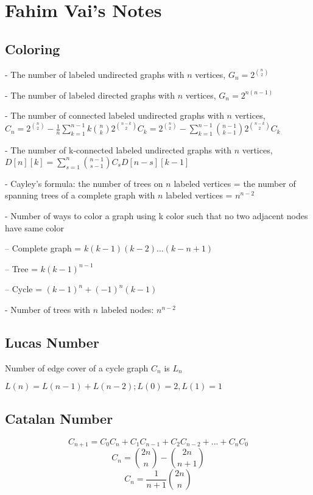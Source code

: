 \chapter{Fahim Vai's Notes}
\section{Coloring}

- The number of labeled undirected graphs with \( n \) vertices, \( G_n = 2^{\binom{n}{2}} \)

- The number of labeled directed graphs with \( n \) vertices, \( G_n = 2^{n(n - 1)} \)

- The number of connected labeled undirected graphs with \( n \) vertices, \( C_n = 2^{\binom{n}{2}} - \frac{1}{n} \sum_{k = 1}^{n - 1} k \binom{n}{k} 2^{\binom{n-k}{2}}C_k = 2^{\binom{n}{2}} - \sum_{k = 1}^{n - 1} \binom{n - 1}{k - 1} 2^{\binom{n-k}{2}}C_k \)

- The number of k-connected labeled undirected graphs with \( n \) vertices, \( D[n][k] = \sum_{s = 1}^{n} \binom{n - 1}{s- 1}C_s D[n - s][k - 1] \)

- Cayley's formula: the number of trees on \( n \) labeled vertices = the number of spanning trees of a complete graph with \( n \) labeled vertices = \( n^{n - 2} \)

- Number of ways to color a graph using k color such that no two adjacent nodes have same color

  -- Complete graph = \( k(k-1)(k-2)...(k-n+1) \)

  -- Tree = \( k(k - 1)^{n - 1} \)

  -- Cycle = \( (k - 1)^n + (-1)^n (k - 1) \)

- Number of trees with $ n $ labeled nodes: $ n^{n - 2} $

\section{Lucas Number}

Number of edge cover of a cycle graph $ C_n $ is $ L_n $

$ L(n) = L(n-1) + L(n-2); L(0)=2, L(1)=1 $

\section{Catalan Number}

\[ C_{n+1}= C_0C_n+C_1C_{n-1}+C_2C_{n-2}+... +C_nC_0 \]
\[ C_n = \binom{2n}{n} - \binom{2n}{n+1} \]
\[ C_n = \frac{1}{n + 1} \binom{2n}{n} \]

